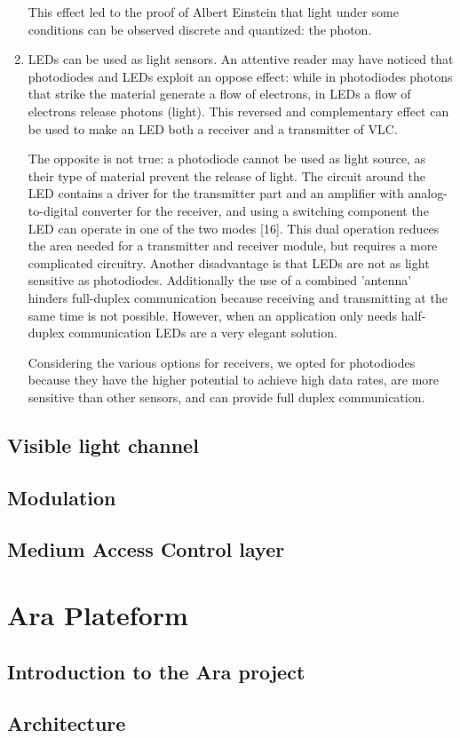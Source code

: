 \begin{enumerate}
This effect led to the proof of Albert Einstein that light under some conditions can be observed discrete and quantized: the photon.

\item LEDs can be used as light sensors. An attentive reader may have noticed that photodiodes and LEDs exploit an oppose effect: while in photodiodes photons that strike the material generate a flow of electrons, in LEDs a flow of electrons release photons (light). This reversed and complementary effect
can be used to make an LED both a receiver and a transmitter of VLC.

The opposite is not true: a photodiode cannot be used as light source, as
their type of material prevent the release of light. The circuit around the LED contains a driver for the transmitter part and an amplifier with analog-to-digital converter for the receiver, and using a switching component the LED can operate in one of the two modes [16].
This dual operation reduces the area needed for a transmitter and receiver
module, but requires a more complicated circuitry. Another disadvantage is
that LEDs are not as light sensitive as photodiodes. Additionally the use of
a combined ’antenna’ hinders full-duplex communication because receiving
and transmitting at the same time is not possible. However, when an
application only needs half-duplex communication LEDs are a very elegant
solution.

Considering the various options for receivers, we opted for photodiodes because
they have the higher potential to achieve high data rates, are more sensitive
than other sensors, and can provide full duplex communication.

\end{enumerate}

\subsection{Visible light channel}
\subsection{Modulation}
\subsection{Medium Access Control layer}

\section{Ara Plateform}
\subsection{Introduction to the Ara project}
\subsection{Architecture}
